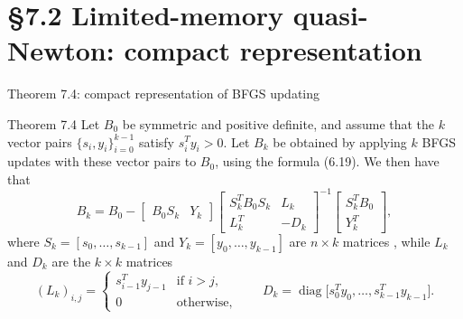 \documentclass[aspectratio=169,12pt]{beamer}
\newcommand{\eqn}[1]{\text{\small(#1)}}
\begin{document}
\section{\S7.2 Limited-memory quasi-Newton: compact representation}

\begin{frame}{Theorem 7.4: compact representation of BFGS updating}
  \begin{block}{Theorem 7.4}\small
    Let $B_{0}$ be symmetric and positive definite, and assume that the $k$ vector pairs
    $\{s_{i},y_{i}\}_{i=0}^{k-1}$ satisfy $s_{i}^{T}y_{i}>0$. Let $B_{k}$ be obtained by applying $k$ BFGS updates
    with these vector pairs to $B_{0}$, using the formula (6.19). We then have that
    \[
      B_{k}=B_{0}-\begin{bmatrix}B_{0}S_{k}&Y_{k}\end{bmatrix}
      \begin{bmatrix}S_{k}^{T}B_{0}S_{k}&L_{k}\\ L_{k}^{T}&-D_{k}\end{bmatrix}^{-1}
      \begin{bmatrix}S_{k}^{T}B_{0}\\ Y_{k}^{T}\end{bmatrix},
      \tag{7.24}
    \]
    where $S_{k}=[s_{0},\dots,s_{k-1}]$ and $Y_{k}=[y_{0},\dots,y_{k-1}]$ are $n\times k$ matrices \eqn{7.25},
    while $L_{k}$ and $D_{k}$ are the $k\times k$ matrices
    \[
      (L_{k})_{i,j}=\begin{cases}s_{i-1}^{T}y_{j-1}&\text{if } i>j,\\ 0&\text{otherwise,}\end{cases}
      \qquad
      D_{k}=\operatorname{diag}\big[s_{0}^{T}y_{0},\dots,s_{k-1}^{T}y_{k-1}\big] .
      \tag{7.26--7.27}
    \]
  \end{block}
\end{frame}
\end{document}

